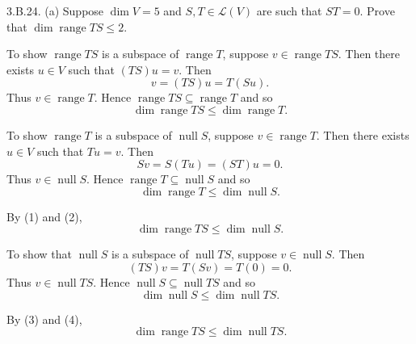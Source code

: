 \documentclass[a5paper]{article}
\begin{document}
\newcommand   \C           {\mathbf{C}}
\newcommand   \R           {\mathbf{R}}
\renewcommand \L           {\mathcal{L}}
\newcommand   \F           {\mathbf{F}}
\renewcommand \P           {\mathcal{P}}
\newcommand   \M           {\mathcal{M}}
\newcommand   \op          {\operatorname}

    3.B.24.
    (a) Suppose $\op{dim}V = 5$ and $S,T \in \L(V)$ are such that $ST=0$.
    Prove that $\op{dim}\op{range}TS \le 2$.

    To show $\op{range}TS$ is a subspace of $\op{range}T$, suppose $v \in \op{range}TS$.
    Then there exists $u \in V$ such that $(TS)u = v$.
    Then
\begin{equation*}
        v = (TS)u = T(Su) .
\end{equation*}
    Thus $v \in \op{range}T$.
    Hence $\op{range}TS \subseteq \op{range}T$ and so
\begin{equation}
        \op{dim}\op{range}TS \le \op{dim}\op{range}T .
\end{equation}

    To show $\op{range}T$ is a subspace of $\op{null}S$, suppose $v \in \op{range}T$.
    Then there exists $u \in V$ such that $Tu = v$.
    Then
\begin{equation*}
        Sv = S(Tu) = (ST)u = 0 .
\end{equation*}
    Thus $v \in \op{null}S$.
    Hence $\op{range}T \subseteq \op{null}S$ and so
\begin{equation}
        \op{dim}\op{range}T \le \op{dim}\op{null}S .
\end{equation}

    By (1) and (2),
\begin{equation}
        \op{dim}\op{range}TS \le \op{dim}\op{null}S .
\end{equation}

    To show that $\op{null}S$ is a subspace of $\op{null}TS$, suppose $v \in \op{null}S$.
    Then
\begin{equation*}
        (TS)v = T(Sv) = T(0) = 0 .
\end{equation*}
    Thus $v \in \op{null}TS$.
    Hence $\op{null}S \subseteq \op{null}TS$ and so
\begin{equation}
        \op{dim}\op{null}S \le \op{dim}\op{null}TS .
\end{equation}

    By (3) and (4),
\begin{equation}
        \op{dim}\op{range}TS \le \op{dim}\op{null}TS .
\end{equation}
\end{document}
